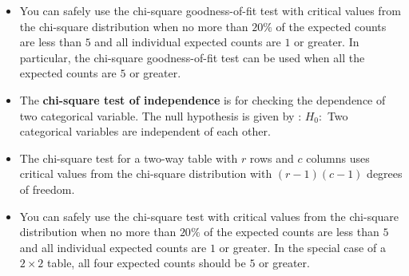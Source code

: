 \documentclass[twoside]{article}
\newcommand{\0}{\mathbf{0}}
\begin{document}
\begin{itemize}
\item You can safely use the chi-square goodness-of-fit test with critical values from the chi-square distribution when no more than $20\%$ of the expected counts are less than $5$ and all individual expected counts are $1$ or greater. In particular, the chi-square goodness-of-fit test can be used when all the expected counts are $5$ or greater.
\item The \textbf{chi-square test of independence} is for checking the dependence of two categorical variable. The null hypothesis is given by :
\subitem $H_0:$ Two categorical variables are independent of each other.
\item The chi-square test for a two-way table with $r$ rows and $c$ columns uses critical values from the chi-square distribution with $(r - 1)(c - 1)$ degrees of freedom.
\item You can safely use the chi-square test with critical values from the chi-square distribution when no more than $20\%$ of the expected counts are less than $5$ and all individual expected counts are $1$ or greater. In the special case of a $2 \times 2$ table, all four expected counts should be $5$ or greater.
\end{itemize}
\end{document}
